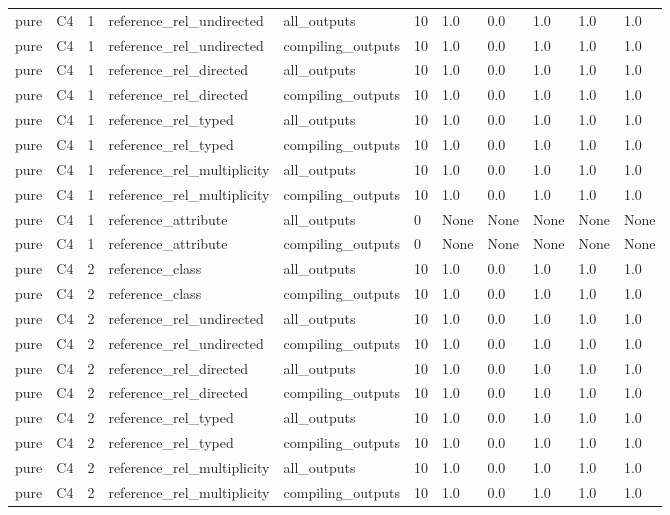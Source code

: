 \begin{tabular}{lllllllllll}
pure & C4 & 1 & reference\_rel\_undirected & all\_outputs & 10 & 1.0 & 0.0 & 1.0 & 1.0 & 1.0 \\
pure & C4 & 1 & reference\_rel\_undirected & compiling\_outputs & 10 & 1.0 & 0.0 & 1.0 & 1.0 & 1.0 \\
pure & C4 & 1 & reference\_rel\_directed & all\_outputs & 10 & 1.0 & 0.0 & 1.0 & 1.0 & 1.0 \\
pure & C4 & 1 & reference\_rel\_directed & compiling\_outputs & 10 & 1.0 & 0.0 & 1.0 & 1.0 & 1.0 \\
pure & C4 & 1 & reference\_rel\_typed & all\_outputs & 10 & 1.0 & 0.0 & 1.0 & 1.0 & 1.0 \\
pure & C4 & 1 & reference\_rel\_typed & compiling\_outputs & 10 & 1.0 & 0.0 & 1.0 & 1.0 & 1.0 \\
pure & C4 & 1 & reference\_rel\_multiplicity & all\_outputs & 10 & 1.0 & 0.0 & 1.0 & 1.0 & 1.0 \\
pure & C4 & 1 & reference\_rel\_multiplicity & compiling\_outputs & 10 & 1.0 & 0.0 & 1.0 & 1.0 & 1.0 \\
pure & C4 & 1 & reference\_attribute & all\_outputs & 0 & None & None & None & None & None \\
pure & C4 & 1 & reference\_attribute & compiling\_outputs & 0 & None & None & None & None & None \\
pure & C4 & 2 & reference\_class & all\_outputs & 10 & 1.0 & 0.0 & 1.0 & 1.0 & 1.0 \\
pure & C4 & 2 & reference\_class & compiling\_outputs & 10 & 1.0 & 0.0 & 1.0 & 1.0 & 1.0 \\
pure & C4 & 2 & reference\_rel\_undirected & all\_outputs & 10 & 1.0 & 0.0 & 1.0 & 1.0 & 1.0 \\
pure & C4 & 2 & reference\_rel\_undirected & compiling\_outputs & 10 & 1.0 & 0.0 & 1.0 & 1.0 & 1.0 \\
pure & C4 & 2 & reference\_rel\_directed & all\_outputs & 10 & 1.0 & 0.0 & 1.0 & 1.0 & 1.0 \\
pure & C4 & 2 & reference\_rel\_directed & compiling\_outputs & 10 & 1.0 & 0.0 & 1.0 & 1.0 & 1.0 \\
pure & C4 & 2 & reference\_rel\_typed & all\_outputs & 10 & 1.0 & 0.0 & 1.0 & 1.0 & 1.0 \\
pure & C4 & 2 & reference\_rel\_typed & compiling\_outputs & 10 & 1.0 & 0.0 & 1.0 & 1.0 & 1.0 \\
pure & C4 & 2 & reference\_rel\_multiplicity & all\_outputs & 10 & 1.0 & 0.0 & 1.0 & 1.0 & 1.0 \\
pure & C4 & 2 & reference\_rel\_multiplicity & compiling\_outputs & 10 & 1.0 & 0.0 & 1.0 & 1.0 & 1.0 \\

\end{tabular}
